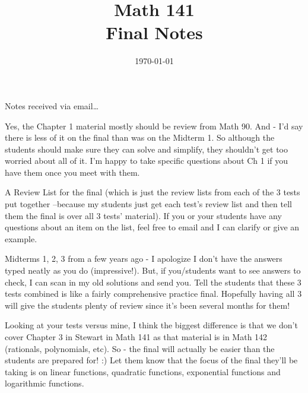 \documentclass{article}
\author{}
\date{\today}
\title{Math 141 \\ Final Notes}
\begin{document}
\maketitle

Notes received via email\dots

Yes, the Chapter 1 material mostly should be review from Math 90. And - I'd say there is less of it on the final than
was on the Midterm 1. So although the students should make sure they can solve and simplify, they shouldn't get too
worried about all of it. I'm happy to take specific questions about Ch 1 if you have them once you meet with them.

A Review List for the final (which is just the review lists from each of the 3 tests put together --because my students
just get each test's review list and then tell them the final is over all 3 tests' material).  If you or your students
have any questions about an item on the list, feel free to email and I can clarify or give an example.

Midterms 1, 2, 3 from a few years ago - I apologize I don't have the answers typed neatly as you do (impressive!). But,
if you/students want to see answers to check, I can scan in my old solutions and send you.  Tell the students that these
3 tests combined is like a fairly comprehensive practice final. Hopefully having all 3 will give the students plenty of
review since it's been several months for them!

Looking at your tests versus mine, I think the biggest difference is that we don't cover Chapter 3 in Stewart in Math
141 as that material is in Math 142 (rationals, polynomials, etc). So - the final will actually be easier than the
students are prepared for! :)  Let them know that the focus of the final they'll be taking is on linear functions,
quadratic functions, exponential functions and logarithmic functions.
\end{document}
